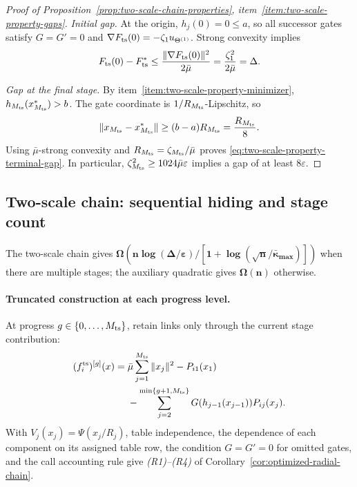 \documentclass{article}
\theoremstyle{definition}
\begin{document}
\begin{proof}[Proof of Proposition~\ref{prop:two-scale-chain-properties},
item~\ref{item:two-scale-property-gaps}]
\emph{Initial gap.}
At the origin, $h_j(0)=0\le a$, so all successor gates satisfy $G=G'=0$ and
$\nabla F_{\rm ts}(0)=-\zeta_1u_{\Theta^{(1)}}$.  Strong convexity implies
\begin{equation}
 F_{\rm ts}(0)-F_{\rm ts}^*
 \le\frac{\|\nabla F_{\rm ts}(0)\|^2}{2\bar\mu}
 =\frac{\zeta_1^2}{2\bar\mu}=\Delta.
\end{equation}

\emph{Gap at the final stage.}
By item~\ref{item:two-scale-property-minimizer},
$h_{M_{\rm ts}}(x_{M_{\rm ts}}^*)>b$.  The gate coordinate is
$1/R_{M_{\rm ts}}$-Lipschitz, so
\begin{equation}
 \|x_{M_{\rm ts}}-x_{M_{\rm ts}}^*\|
 \ge(b-a)R_{M_{\rm ts}}=\frac{R_{M_{\rm ts}}}{8}.
\end{equation}
Using $\bar\mu$-strong convexity and
$R_{M_{\rm ts}}=\zeta_{M_{\rm ts}}/\bar\mu$ proves
\eqref{eq:two-scale-property-terminal-gap}.  In particular,
$\zeta_{M_{\rm ts}}^2\ge1024\bar\mu\varepsilon$ implies a gap of at least
$8\varepsilon$.
\end{proof}

\subsection{Two-scale chain: sequential hiding and stage count}

The two-scale chain gives
$\boldsymbol{\Omega\!\left(n\log(\Delta/\varepsilon)/
[1+\log(\sqrt n/\bar\kappa_{\max})]\right)}$ when there are multiple stages; the
auxiliary quadratic gives $\boldsymbol{\Omega(n)}$ otherwise.

\paragraph{Truncated construction at each progress level.}
At progress $g\in\{0,\ldots,M_{\rm ts}\}$, retain links only through the
current stage contribution:
\begin{equation}
\begin{aligned}
 (f_i^{\rm ts})^{[g]}(x)
 ={}&\bar\mu\sum_{j=1}^{M_{\rm ts}}\|x_j\|^2-P_{i1}(x_1)\\
 &-\sum_{j=2}^{\min\{g+1,M_{\rm ts}\}}
 G(h_{j-1}(x_{j-1}))P_{ij}(x_j).
\end{aligned}
\label{eq:two-scale-truncation}
\end{equation}
With $V_j(x_j)=\Psi(x_j/R_j)$, table independence, the dependence of each
component on its assigned table row, the condition $G=G'=0$ for omitted gates,
and the call accounting rule give \emph{(R1)--(R4)} of
Corollary~\ref{cor:optimized-radial-chain}.
\end{document}
